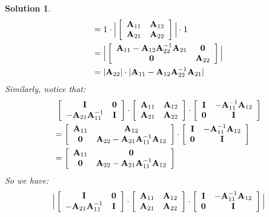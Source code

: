 \documentclass[11pt]{article}
\newtheorem{sol}{Solution}
\begin{document}
\begin{sol}
\begin{align*}
		&= 1 \cdot  \Big|\left[\begin{array}{cc} {\bf A}_{11}&{\bf A}_{12} \\ {\bf A}_{21}&{\bf A}_{22} \end{array}\right]\Big|\cdot 1\\
		&= \Big|  \left[\begin{array}{cc} {\bf A}_{11} - {\bf A}_{12}{\bf A}_{22}^{-1}{\bf A}_{21}& {\bf 0}\\ {\bf 0}&{\bf A}_{22} \end{array}\right]\Big|\\
		&=|{\bf A}_{22}|\cdot |{\bf A}_{11} - {\bf A}_{12}{\bf A}_{22}^{-1}{\bf A}_{21}|
	\end{align*}
	Similarly, notice that:
	\begin{align*}
		&\ \left[\begin{array}{cc} {\bf I}& {\bf 0}\\ -{\bf A}_{21}{\bf A}_{11}^{-1}& {\bf I}\end{array}\right]\cdot \left[\begin{array}{cc} {\bf A}_{11}& {\bf A}_{12}\\ {\bf A}_{21}&{\bf A}_{22} \end{array}\right]\cdot \left[\begin{array}{cc} {\bf I}& -{\bf A}_{11}^{-1}{\bf A}_{12}\\ {\bf 0}& {\bf I}\end{array}\right] \\
		&= \left[\begin{array}{cc} {\bf A}_{11}& {\bf A}_{12}\\ {\bf 0}& {\bf A}_{22}- {\bf A}_{21}{\bf A}_{11}^{-1}{\bf A}_{12}\end{array}\right]\cdot \left[\begin{array}{cc} {\bf I}& -{\bf A}_{11}^{-1}{\bf A}_{12}\\ {\bf 0}& {\bf I}\end{array}\right]\\
		&= \left[\begin{array}{cc}{\bf A}_{11}& {\bf 0}\\ {\bf 0}& {\bf A}_{22} - {\bf A}_{21}{\bf A}_{11}^{-1}{\bf A}_{12}\end{array}\right]
	\end{align*}
	So we have:
	\begin{align*}
		&\ \Big|\left[\begin{array}{cc} {\bf I}& {\bf 0}\\ -{\bf A}_{21}{\bf A}_{11}^{-1}& {\bf I}\end{array}\right]\cdot \left[\begin{array}{cc} {\bf A}_{11}& {\bf A}_{12}\\ {\bf A}_{21}&{\bf A}_{22} \end{array}\right]\cdot \left[\begin{array}{cc} {\bf I}& -{\bf A}_{11}^{-1}{\bf A}_{12}\\ {\bf 0}& {\bf I}\end{array}\right] \Big|\\

\end{align*}
\end{sol}
\end{document}
